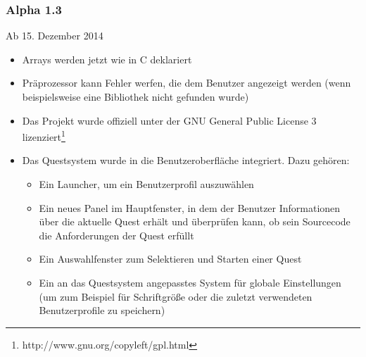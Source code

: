\subsubsection*{Alpha 1.3}
Ab 15. Dezember 2014
\begin{itemize}
\item Arrays werden jetzt wie in C deklariert
\item Präprozessor kann Fehler werfen, die dem Benutzer angezeigt werden (wenn beispielsweise eine Bibliothek nicht gefunden wurde)
\item Das Projekt wurde offiziell unter der GNU General Public License 3 lizenziert\footnote{http://www.gnu.org/copyleft/gpl.html}
\item Das Questsystem wurde in die Benutzeroberfläche integriert. Dazu gehören:
\begin{itemize}
\item Ein Launcher, um ein Benutzerprofil auszuwählen
\item Ein neues Panel im Hauptfenster, in dem der Benutzer Informationen über die aktuelle Quest erhält und überprüfen kann, ob sein Sourcecode die Anforderungen der Quest erfüllt
\item Ein Auswahlfenster zum Selektieren und Starten einer Quest
\item Ein an das Questsystem angepasstes System für globale Einstellungen (um zum Beispiel für Schriftgröße oder die zuletzt verwendeten Benutzerprofile zu speichern)
\end{itemize}
\end{itemize}

